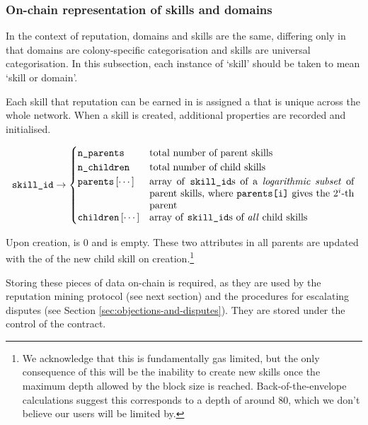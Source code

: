 \subsubsection{On-chain representation of skills and domains}\label{subsec:on-chain-representation-of-skills}

In the context of reputation, domains and skills are the same, differing only in that domains are colony-specific categorisation and skills are universal categorisation. In this subsection, each instance of `skill' should be taken to mean `skill or domain'.

Each skill that reputation can be earned in is assigned a  that is unique across the whole network. When a skill is created, additional properties are recorded and initialised.

\begin{equation*}
  \ascode{skill\_id} \rightarrow
  \begin{cases}
    \ascode{n\_parents} &	\textnormal{total number of parent skills}\\
    \ascode{n\_children} &	\textnormal{total number of child skills}\\
    \ascode{parents}\left[\cdots\right] &	\parbox[t]{.6\linewidth}{\textnormal{array of \ascode{skill\_id}s of a \textit{logarithmic subset} of parent skills, where \ascode{parents[i]} gives the $2^i$-th parent}}\\
    \ascode{children}\left[\cdots\right] &	\textnormal{array of \ascode{skill\_id}s of \textit{all} child skills}
  \end{cases}
\end{equation*}

Upon creation,  is 0 and  is empty\watermark. These two attributes in all parents are updated with the  of the new child skill on creation.\footnote{We acknowledge that this is fundamentally gas limited, but the only consequence of this will be the inability to create new skills once the maximum depth allowed by the block size is reached. Back-of-the-envelope calculations suggest this corresponds to a depth of around 80, which we don't believe our users will be limited by.}

Storing these pieces of data on-chain is required, as they are used by the reputation mining protocol (see next section) and the procedures for escalating disputes (see Section \ref{sec:objections-and-disputes}). They are stored under the control of the  contract.

